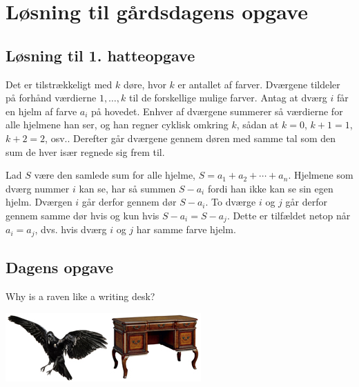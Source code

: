 \begin{minipage}[t]{100mm}
\vspace{3mm}
\section*{Løsning til gårdsdagens opgave}
\subsection*{Løsning til 1. hatteopgave}
Det er tilstrækkeligt med $k$ døre, hvor $k$ er antallet af farver. Dværgene tildeler på forhånd værdierne $1,\dotsc,k$ til de forskellige mulige farver. Antag at dværg $i$ får en hjelm af farve $a_i$ på hovedet. Enhver af dværgene summerer så værdierne for alle hjelmene han ser, og han regner cyklisk omkring $k$, sådan at $k=0$, $k+1=1$, $k+2=2$, osv.. Derefter går dværgene gennem døren med samme tal som den sum de hver især regnede sig frem til.

Lad $S$ være den samlede sum for alle hjelme, $S=a_1+a_2+\dotsb+a_n$. Hjelmene som dværg nummer $i$ kan se, har så summen $S-a_i$ fordi han ikke kan se sin egen hjelm. Dværgen $i$ går derfor gennem dør $S-a_i$. To dværge $i$ og $j$ går derfor gennem samme dør hvis og kun hvis $S-a_i=S-a_j$. Dette er tilfældet netop når $a_i=a_j$, dvs. hvis dværg $i$ og $j$ har samme farve hjelm.

\vspace{-4mm}
\begin{center}
\section*{Dagens opgave}
Why is a raven like a writing desk?
\end{center}
\includegraphics[width=\linewidth]{raven_and_desk.jpg}


\end{minipage}
